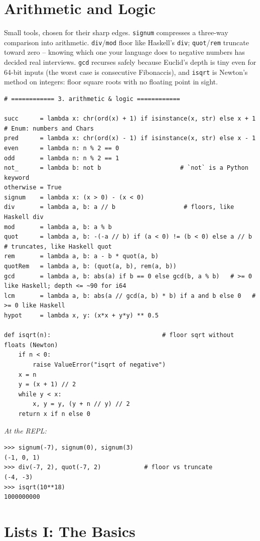 \documentclass[11pt,letterpaper]{book}
\begin{document}
\chapter{Arithmetic and Logic}

Small tools, chosen for their sharp edges. \texttt{signum} compresses a
three-way comparison into arithmetic. \texttt{div}/\texttt{mod} floor like
Haskell's \texttt{div}; \texttt{quot}/\texttt{rem} truncate toward zero --
knowing which one your language does to negative numbers has decided real
interviews. \texttt{gcd} recurses safely because Euclid's depth is tiny even
for 64-bit inputs (the worst case is consecutive Fibonaccis), and
\texttt{isqrt} is Newton's method on integers: floor square roots with no
floating point in sight.
\begin{lstlisting}[style=code]
# ============ 3. arithmetic & logic ============

succ      = lambda x: chr(ord(x) + 1) if isinstance(x, str) else x + 1   # Enum: numbers and Chars
pred      = lambda x: chr(ord(x) - 1) if isinstance(x, str) else x - 1
even      = lambda n: n % 2 == 0
odd       = lambda n: n % 2 == 1
not_      = lambda b: not b                      # `not` is a Python keyword
otherwise = True
signum    = lambda x: (x > 0) - (x < 0)
div       = lambda a, b: a // b                   # floors, like Haskell div
mod       = lambda a, b: a % b
quot      = lambda a, b: -(-a // b) if (a < 0) != (b < 0) else a // b   # truncates, like Haskell quot
rem       = lambda a, b: a - b * quot(a, b)
quotRem   = lambda a, b: (quot(a, b), rem(a, b))
gcd       = lambda a, b: abs(a) if b == 0 else gcd(b, a % b)   # >= 0 like Haskell; depth <= ~90 for i64
lcm       = lambda a, b: abs(a // gcd(a, b) * b) if a and b else 0   # >= 0 like Haskell
hypot     = lambda x, y: (x*x + y*y) ** 0.5

def isqrt(n):                               # floor sqrt without floats (Newton)
    if n < 0:
        raise ValueError("isqrt of negative")
    x = n
    y = (x + 1) // 2
    while y < x:
        x, y = y, (y + n // y) // 2
    return x if n else 0
\end{lstlisting}

\noindent\textit{At the REPL:}
\begin{lstlisting}[style=spec]
>>> signum(-7), signum(0), signum(3)
(-1, 0, 1)
>>> div(-7, 2), quot(-7, 2)            # floor vs truncate
(-4, -3)
>>> isqrt(10**18)
1000000000
\end{lstlisting}
\chapter{Lists I: The Basics}
\end{document}
